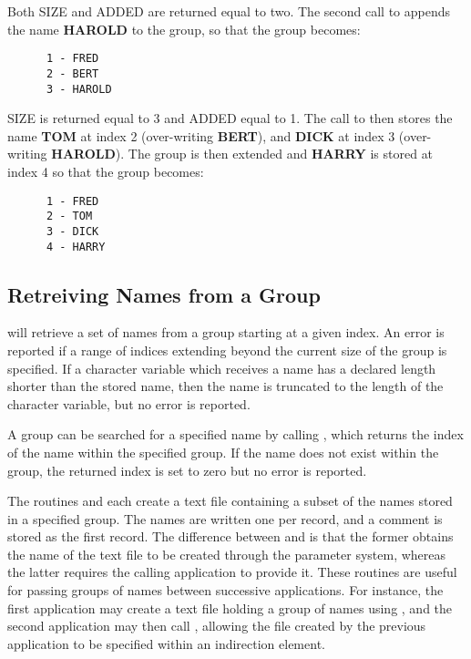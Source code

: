 Both SIZE and ADDED are returned equal to two. The second call to 
appends the name {\bf HAROLD} to the group, so that the group becomes:

\small
\begin{verbatim}
      1 - FRED
      2 - BERT
      3 - HAROLD
\end{verbatim}
\normalsize

SIZE is returned equal to 3 and ADDED equal to 1. The call to 
then stores the name {\bf TOM} at index 2 (over-writing {\bf BERT}), and {\bf
DICK} at index 3 (over-writing {\bf HAROLD}). The group is then extended and
{\bf HARRY} is stored at index 4 so that the group becomes:

\small
\begin{verbatim}
      1 - FRED
      2 - TOM
      3 - DICK
      4 - HARRY
\end{verbatim}
\normalsize

\subsection{Retreiving Names from a Group}
 will retrieve a set of names from a group starting at a given index. An
error is reported if a range of indices extending beyond the current size of
the group is specified. If a character variable which receives a name  has a
declared length shorter than the stored name, then the name is truncated to the
length of the character variable, but no error is reported.

A group can be searched for a specified name by calling , which
returns the index of the name within the specified group. If the name does
not exist within the group, the returned index is set to zero but no error is
reported.

The routines  and  
each create a text file containing a
subset of the names stored in a specified group. The names are written one per
record, and a comment is stored as the first record. The difference between
 and  is that the former 
obtains the name of the text file to
be created through the parameter system, whereas the latter requires the calling
application to provide it. These routines are useful for passing groups of names
between successive applications. For instance, the first application may create
a text file holding a group of names using , and the second application
may then call , allowing the file created by the previous application
to be specified within an indirection element.

